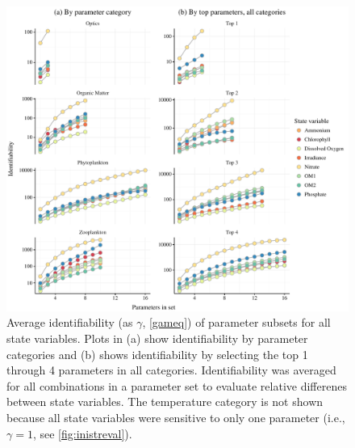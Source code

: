 \documentclass[letterpaper,12pt,oneside]{article}\usepackage[]{graphicx}\usepackage[]{color}
\makeatletter
\def\maxwidth{ %
  \ifdim\Gin@nat@width>\linewidth
    \linewidth
  \else
    \Gin@nat@width
  \fi
}
\makeatother
\begin{document}
\begin{figure}[!ht]

{\centering \includegraphics[width=\maxwidth]{figs/identploall-1} 

}

\caption{Average identifiability (as $\gamma$, \cref{gameq}) of parameter subsets for all state variables.  Plots in (a) show identifiability by parameter categories and (b) shows identifiability by selecting the top 1 through 4 parameters in all categories.  Identifiability was averaged for all combinations in a parameter set to evaluate relative differenes between state variables.  The temperature category is not shown because all state variables were sensitive to only one parameter (i.e., $\gamma = 1$, see \cref{fig:inistreval}).}\label{fig:identploall}
\end{figure}
\end{document}
